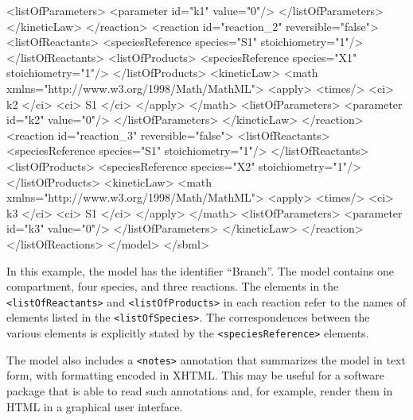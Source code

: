 \documentclass[10pt,twocolumntoc]{cekarticle}
\begin{document}
\begin{example}
                    <listOfParameters>
                        <parameter id="k1" value="0"/>
                    </listOfParameters>
                </kineticLaw>
            </reaction>
            <reaction id="reaction_2" reversible="false">
                <listOfReactants>
                    <speciesReference species="S1" stoichiometry="1"/>
                </listOfReactants>
                <listOfProducts>
                    <speciesReference species="X1" stoichiometry="1"/>
                </listOfProducts>
                <kineticLaw>
                    <math xmlns="http://www.w3.org/1998/Math/MathML">
                        <apply>
                            <times/>
                            <ci> k2 </ci>
                            <ci> S1 </ci>
                        </apply>
                    </math>
                    <listOfParameters>
                        <parameter id="k2" value="0"/>
                    </listOfParameters>
                </kineticLaw>
            </reaction>
            <reaction id="reaction_3" reversible="false">
                <listOfReactants>
                    <speciesReference species="S1" stoichiometry="1"/>
                </listOfReactants>
                <listOfProducts>
                    <speciesReference species="X2" stoichiometry="1"/>
                </listOfProducts>
                <kineticLaw>
                    <math xmlns="http://www.w3.org/1998/Math/MathML">
                        <apply>
                            <times/>
                            <ci> k3 </ci>
                            <ci> S1 </ci>
                        </apply>
                    </math>
                    <listOfParameters>
                        <parameter id="k3" value="0"/>
                    </listOfParameters>
                </kineticLaw>
            </reaction>
        </listOfReactions>
    </model>
</sbml>
\end{example}

In this example, the model has the identifier ``Branch''.  The model contains one
compartment, four species, and three reactions.  The elements in the
\texttt{<listOfReactants>} and \texttt{<listOfProducts>} in each reaction
refer to the names of elements listed in the \texttt{<listOfSpecies>}.  The
correspondences between the various elements is explicitly stated by the
\texttt{<speciesReference>} elements.

The model also includes a \texttt{<notes>} annotation that summarizes the
model in text form, with formatting encoded in XHTML.  This may be useful for
a software package that is able to read such annotations and, for example,
render them in HTML in a graphical user interface.
\end{document}

